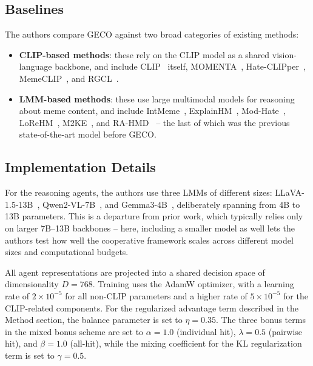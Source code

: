 \documentclass[manuscript,review]{acmart}
\begin{document}
\subsection{Baselines}

The authors compare GECO against two broad categories of existing methods:

\begin{itemize}
    \item \textbf{CLIP-based methods}: these rely on the CLIP model as a shared
    vision-language backbone, and include CLIP~\cite{radford2021clip} itself,
    MOMENTA~\cite{pramanick2021momenta}, Hate-CLIPper~\cite{kumar2022hateclipper},
    MemeCLIP~\cite{shah2024memeclip}, and RGCL~\cite{mei2024rgcl}.
    \item \textbf{LMM-based methods}: these use large multimodal models for reasoning
    about meme content, and include IntMeme~\cite{hee2025intmeme},
    ExplainHM~\cite{lin2024explainhm}, Mod-Hate~\cite{cao2024modhate},
    LoReHM~\cite{huang2024lorehm}, M2KE~\cite{lu2025m2ke}, and
    RA-HMD~\cite{mei2025rahmd} -- the last of which was the previous state-of-the-art
    model before GECO.
\end{itemize}

\subsection{Implementation Details}

For the reasoning agents, the authors use three LMMs of different sizes: LLaVA-1.5-13B~\cite{liu2023llava},
Qwen2-VL-7B~\cite{wang2024qwen2vl}, and Gemma3-4B~\cite{gemma2025gemma3}, deliberately spanning from 4B to 13B parameters. This is a
departure from prior work, which typically relies only on larger 7B--13B backbones --
here, including a smaller model as well lets the authors test how well the cooperative
framework scales across different model sizes and computational budgets.

All agent representations are projected into a shared decision space of dimensionality
$D = 768$. Training uses the AdamW optimizer, with a learning rate of $2 \times 10^{-5}$
for all non-CLIP parameters and a higher rate of $5 \times 10^{-5}$ for the CLIP-related
components. For the regularized advantage term described in the Method section, the
balance parameter is set to $\eta = 0.35$. The three bonus terms in the mixed bonus
scheme are set to $\alpha = 1.0$ (individual hit), $\lambda = 0.5$ (pairwise hit), and
$\beta = 1.0$ (all-hit), while the mixing coefficient for the KL regularization term is
set to $\gamma = 0.5$.
\end{document}
